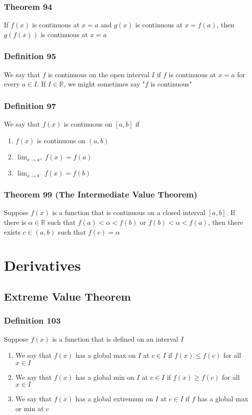 \documentclass[12pt, letterpaper]{article}
\begin{document}
\subsubsection*{Theorem 94}
If $f(x)$ is continuous at $x=a$ and $g(x)$ is continuous at $x=f(a)$, then $g(f(x))$ is continuous at $x=a$
\subsubsection*{Definition 95}
We say that $f$ is continuous on the open interval $I$ if $f$ is continuous at $x=a$ for every $a\in I$. If $I\in\mathbb{R}$, 
we might sometimes say "$f$ is continuous"
\subsubsection*{Definition 97}
We say that $f(x)$ is continuous on $[a,b]$ if 
\begin{enumerate}
    \item $f(x)$ is continuous on $(a,b)$
    \item $\displaystyle\lim_{x\to a^+} f(x) = f(a)$
    \item $\displaystyle\lim_{x\to b^-} f(x) = f(b)$
\end{enumerate}
\subsubsection*{Theorem 99 (The Intermediate Value Theorem)}
Suppose $f(x)$ is a function that is continuous on a closed interval $[a,b]$. If there is $\alpha\in\mathbb{R}$ such that 
$f(a) < \alpha < f(b)$ or $f(b) < \alpha < f(a)$, then there exists $c\in(a,b)$ such that $f(c) = \alpha$


\section{Derivatives}
\subsection{Extreme Value Theorem}
\subsubsection*{Definition 103}
Suppose $f(x)$ is a function that is defined on an interval $I$
\begin{enumerate}
    \item We say that $f(x)$ has a global max on $I$ at $c\in I$ if $f(x) \leq f(c)$ for all $x\in I$
    \item We say that $f(x)$ has a global min on $I$ at $c\in I$ if $f(x) \geq f(c)$ for all $x\in I$
    \item We say that $f(x)$ has a global extremum on $I$ at $c\in I$ if $f$ has a global max or min at c
\end{enumerate}
\end{document}
